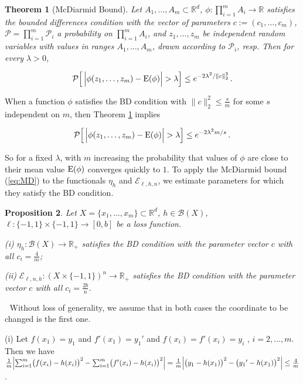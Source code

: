 \documentclass{elsarticle}
\def\n{\noindent}
\def\bop{\noindent {\bf Proof.}$ \;$ }
\def\E{{\rm E}}
\def\cP{{\mathcal P}}
\def\cE{{\mathcal E}}
\def\cB{{\mathcal B}}
\def\cP{{\mathcal P}}
\def\bR{{\mathbb R}}
\def\n{\noindent}
\def\bop{\noindent {\bf Proof.\ }}
\def\bop{\noindent {\bf Proof.}$ \;$ }
\newtheorem{theorem}{Theorem}[section]
\newtheorem{proposition}[theorem]{Proposition}
\begin{document}
\begin{theorem}[McDiarmid Bound]
Let $A_1, \dots, A_m \subset \bR^d$, $\phi: \prod_{i=1}^m A_i  \to \bR$ satisfies the bounded differences condition with the vector of parameters $c:= (c_1, \ldots, c_m)$,  $\cP = \prod_{i=1}^m \cP_i$ a probability on $\prod_{i=1}^m A_i$, and $z_1, \ldots, z_m$ be independent random variables with values in ranges $A_1, \ldots, A_m$, drawn according to $\cP_i$, resp. Then for every $\lambda>0$,

\begin{equation}
\cP\Bigl [ \, \Bigl | \phi(z_1, \ldots, z_m) - \E(\phi)\Bigr | > \lambda \Bigr ]  \leq e^{-2\lambda^2/\| c \|_2^2}\,.
\end{equation}
\label{th:MD}
\end{theorem}


\n When a function $\phi$ satisfies the BD condition with $\|c\|_2^2 \leq \frac{s}{m}$ for some $s$ independent on $m$, then Theorem \ref{th:MD} implies

\begin{equation}
\cP\Bigl [ \, \Bigl | \phi(z_1, \ldots, z_m) - \E(\phi)\Bigr | > \lambda \Bigr ]  \leq e^{-2\lambda^2m/s}\,.
\label{eq:MD}
\end{equation}

\n So for a fixed $\lambda$, with $m$ increasing the probability that values of $\phi$ are close to their mean value $\E(\phi)$ converges quickly to $1$.
To apply the McDiarmid bound (\ref{eq:MD}) to the functionals $\eta_{h}$  and $\cE_{\ell,h,n}$, we estimate parameters for which  they satisfy the BD condition.

\begin{proposition}
Let $X = \{x_1, \dots, x_m\} \subset \bR^d$,  $h \in \cB(X)$, $\ell: \{-1,1\} \times \{-1,1\} \to [0,b]$ be a loss function.

 (i) $\eta_{h}: \cB(X) \to \bR_+$ satisfies the BD condition with the parameter vector $c$ with all $c_i= \frac{4}{m}$;

(ii) $\cE_{\ell,n,h}: (X \times \{-1,1\})^n \to \bR_+$ satisfies the BD condition with the parameter vector $c$ with all $c_i=\frac{2b}{n}$.
\label{pr:BD}
\end{proposition}

\bop
Without loss of generality, we assume that in both cases the coordinate to be changed is the first one.

(i) Let $f(x_1) = y_1$ and $f'(x_1)= {y_1}'$ and $f(x_i) = f'(x_i) = y_i$ , $i=2, \dots, m$. Then we have\\
$\frac{1}{m}  \Bigl |
\sum_{i=1}^m \bigl ( f(x_i) - h(x_i) \bigr )^2  -
\sum_{i=1}^m \bigl ( f'(x_i) - h(x_i) \bigr )^2
\Bigr | =
\frac{1}{m} \Bigl |
\bigl (y_1 - h(x_1)\bigr )^2 - \bigl ({y_1}' - h(x_1) \bigr )^2   \Bigr |  \leq \frac{4}{m}$.
\end{document}
